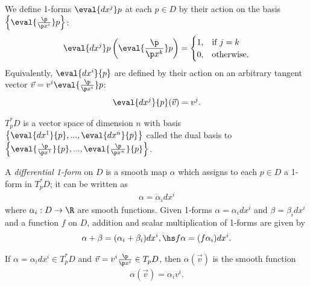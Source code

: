 \documentclass{article}
\begin{document}
\begin{definition}
	We define 1-forms $\eval{dx^j}p$ at each $p\in D$ by their action on the basis
	$\left\lbrace\eval{\frac{\p }{\p x^i}}p\right\rbrace$:
	\begin{align*}
		\eval{dx^j}p\left(\eval{\frac{\p }{\p x^k}}p\right)= \begin{cases}
			                                                     1, & \text{if } j = k  \\
			                                                     0, & \text{otherwise}.
		                                                     \end{cases}
	\end{align*}
	Equivalently, $\eval{dx^i}{p}$ are defined by their action on an arbitrary tangent vector
	$\vec v = v^i\eval{\frac{\p }{\p x^i}}p$:
	\begin{align*}
		\eval{dx^j}{p}(\vec v) = v^j.
	\end{align*}
\end{definition}

\begin{lemma}
	$T_p^*D$ is a vector space of dimension $n$ with basis
	$\left\lbrace \eval{dx^1}{p},...,\eval{dx^n}{p}\right\rbrace$ called the dual basis to
	$\left\lbrace \eval{\frac{\p }{\p x^1}}{p}, ..., \eval{\frac{\p }{\p x^n}}{p}\right\rbrace$.
\end{lemma}

\begin{definition}
	A \emph{differential 1-form} on $D$ is a smooth map $\alpha$ which assigns to each $p\in D$
	a 1-form in $T^*_pD$; it can be written as
	\begin{align*}
		\alpha = \alpha_i dx^i
	\end{align*}
	where $\alpha_i:D\to\R$ are smooth functions. Given 1-forms $\alpha=\alpha_idx^i$ and
	$\beta=\beta_idx^i$ and a function $f$ on $D$, addition and scalar multiplication of
	1-forms are given by
	\begin{align*}
		\alpha + \beta = (\alpha_i + \beta_i)dx^i,\hs f\alpha = (f\alpha_i)dx^i.
	\end{align*}
\end{definition}

\begin{lemma}[Notes 4.16]
	If $\alpha=\alpha_i dx^i\in T_p^*D$ and $\vec v=v^i\frac{\p }{\p x^i}\in T_pD$,
	then $\alpha(\vec v)$ is the smooth function
	\begin{align*}
		\alpha(\vec v) = \alpha_i v^i.
	\end{align*}
\end{lemma}
\end{document}
